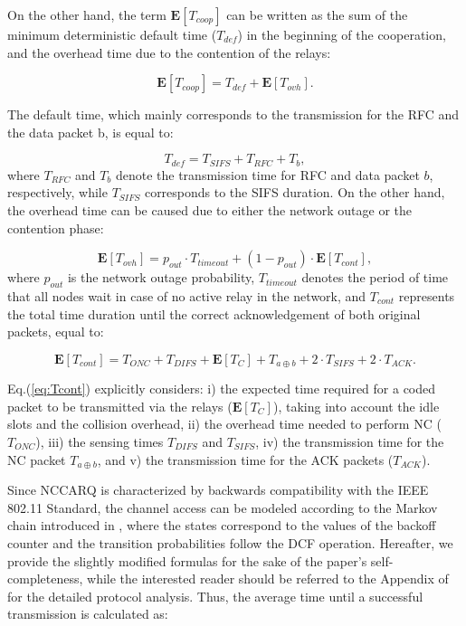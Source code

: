 \documentclass[12pt,draftcls, onecolumn]{IEEEtran}
\begin{document}
On the other hand, the term $\mathbf{E}[T_{coop}]$ can be written as the sum of the minimum deterministic default time ($T_{def}$) in the beginning of the cooperation, and the overhead time due to the contention of the relays:

\begin{equation}
\label{eq:Tcoop}
 	\mathbf{E}[T_{coop}]= T_{def}+\mathbf{E}[T_{ovh}].
\end{equation}

The default time, which mainly corresponds to the transmission for the RFC and the data packet b, is equal to:

\begin{equation}
\label{eq:Tdef}
T_{def}=T_{SIFS}+T_{RFC}+T_{b},
\end{equation}
where $T_{RFC}$ and $T_{b}$ denote the transmission time for RFC and data packet $b$, respectively, while $T_{SIFS}$ corresponds to the SIFS duration. On the other hand, the overhead time can be caused due to either the network outage or the contention phase:

\begin{equation}
\label{eq:Tovh}
\mathbf{E}[T_{ovh}]=p_{out}\cdot T_{timeout}+(1-p_{out})\cdot\mathbf{E}[T_{cont}],
\end{equation}
where $p_{out}$ is the network outage probability, $T_{timeout}$ denotes the period of time that all nodes wait in case of no active relay in the network, and $T_{cont}$ represents the total time duration until the correct acknowledgement of both original packets, equal to:

\begin{equation}
\label{eq:Tcont}
 	\mathbf{E}[T_{cont}]=T_{ONC}+T_{DIFS}+\mathbf{E}[T_{C}]+T_{a \oplus b}+2\cdot T_{SIFS}+2\cdot T_{ACK}.
\end{equation}

Eq.(\ref{eq:Tcont}) explicitly considers: i) the expected time required for a coded packet to be transmitted via the relays ($\mathbf{E}[T_{C}]$), taking into account the idle slots and the collision overhead, ii) the overhead time needed to perform NC ($T_{ONC}$), iii) the sensing times $T_{DIFS}$ and $T_{SIFS}$, iv) the transmission time for the NC packet $T_{a \oplus b}$, and v) the transmission time for the ACK packets ($T_{ACK}$).

Since NCCARQ is characterized by backwards compatibility with the IEEE 802.11 Standard, the channel access can be modeled according to the Markov chain introduced in \cite{bianchi}, where the states correspond to the values of the backoff counter and the transition probabilities follow the DCF operation. Hereafter, we provide the slightly modified formulas for the sake of the paper's self-completeness, while the interested reader should be referred to the Appendix of \cite{nccarq} for the detailed protocol analysis. Thus, the average time until a successful transmission is calculated as:
\end{document}
